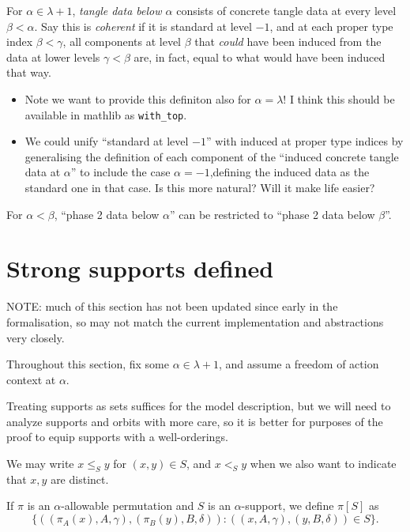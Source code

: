 \begin{definition}
  \label{def:coherent-tangle-data}
  For $\alpha \in \lambda + 1$, \emph{tangle data below $\alpha$} consists of concrete tangle data at every level $\beta < \alpha$.  Say this is \emph{coherent} if it is standard at level $-1$, and at each proper type index $\beta < \gamma$, all components at level $\beta$ that \emph{could} have been induced from the data at lower levels $\gamma < \beta$ are, in fact, equal to what would have been induced that way.

  \begin{itemize}
  \item Note we want to provide this definiton also for $\alpha = \lambda$!  I think this should be available in mathlib as \verb|with_top|.
  \item We could unify “standard at level $-1$” with induced at proper type indices by generalising the definition of each component of the “induced concrete tangle data at $\alpha$” to include the case $\alpha = -1$,defining the induced data as the standard one in that case.  Is this more natural?  Will it make life easier?
  \end{itemize}

  For $\alpha < \beta$, “phase 2 data below $\alpha$” can be restricted to “phase 2 data below $\beta$”.
\end{definition}

\section{Strong supports defined}

NOTE: much of this section has not been updated since early in the formalisation, so may not match the current implementation and abstractions very closely.

Throughout this section, fix some $\alpha \in \lambda + 1$, and assume a freedom of action context at $\alpha$.

Treating supports as sets suffices for the model description, but we will need to analyze supports and orbits with more care, so it is better for purposes
of the proof to equip supports with a well-orderings.

We may write $x \leq_S y$ for $(x,y) \in S$, and $x <_S y$ when we also want to indicate that $x,y$ are distinct.

If $\pi$ is an $\alpha$-allowable permutation and $S$ is an $\alpha$-support, we define $\pi[S]$ as $$\{((\pi_A(x),A,\gamma),(\pi_B(y),B,\delta)):((x,A,\gamma),(y,B,\delta))\in S\}.$$

